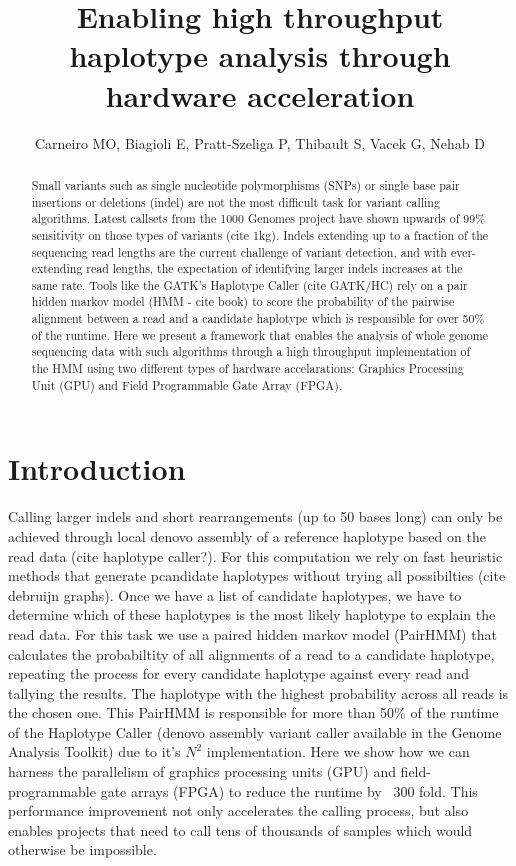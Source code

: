 \documentclass[11pt, oneside]{article}
\title{Enabling high throughput haplotype analysis through hardware acceleration}
\author{Carneiro MO, Biagioli E, Pratt-Szeliga P, Thibault S, Vacek G, Nehab D}
\begin{document}
 \maketitle
	
	\begin{abstract} 
	
	Small variants such as single nucleotide polymorphisms (SNPs) or single base
	pair insertions or deletions (indel) are not the most difficult task for
	variant calling algorithms. Latest callsets from the 1000 Genomes project
	have shown upwards of 99\% sensitivity on those types of variants (cite
	1kg). Indels extending up to a fraction of the sequencing read lengths are
	the current challenge of variant detection, and with ever-extending read
	lengths, the expectation of identifying larger indels increases at the same
	rate. Tools like the GATK's Haplotype Caller (cite GATK/HC) rely on a pair
	hidden markov model (HMM - cite book) to score the probability of the pairwise alignment
	between a read and a candidate haplotype which is responsible for over 50\%
	of the runtime. Here we present a framework that enables the analysis of
	whole genome sequencing data with such algorithms through a high throughput
	implementation of the HMM using two different types of hardware
	accelarations: Graphics Processing Unit (GPU) and Field Programmable Gate
	Array (FPGA).
	
	\end{abstract}

	\section{Introduction} 

	Calling larger indels and short rearrangements (up to 50 bases
	long) can only be achieved through local denovo assembly of a
	reference haplotype based on the read data (cite haplotype caller?).
	For this computation we rely on fast heuristic methods that generate
	pcandidate haplotypes without trying all possibilties (cite debruijn
	graphs). Once we have a list of candidate haplotypes, we
	have to determine which of these haplotypes is the most likely
	haplotype to explain the read data. For this task we use a paired
	hidden markov model (PairHMM) that calculates the probabiltity of
	all alignments of a read to a candidate haplotype, repeating the
	process for every candidate haplotype against every read and
	tallying the results. The haplotype with the highest probability
	across all reads is the chosen one. This PairHMM is responsible for
	more than 50\% of the runtime of the Haplotype Caller (denovo
	assembly variant caller available in the Genome Analysis
	Toolkit) due to it's $N^2$ implementation. Here we show how
	we can harness the parallelism of graphics processing units (GPU)
	and field-programmable gate arrays (FPGA) to reduce the runtime by ~300
	fold. This performance improvement not only accelerates the calling process,
	but also enables projects that need to call tens of thousands of samples
	which would otherwise be impossible.  
	
\end{document}
